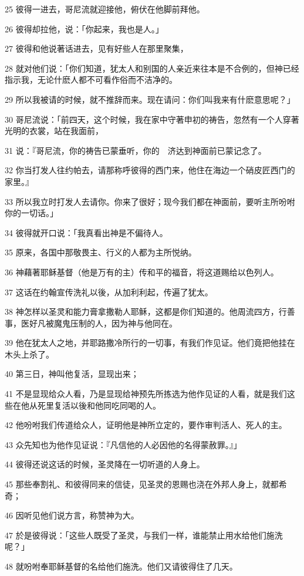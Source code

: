 \par 25 彼得一进去，哥尼流就迎接他，俯伏在他脚前拜他。
\par 26 彼得却拉他，说：「你起来，我也是人。」
\par 27 彼得和他说著话进去，见有好些人在那里聚集，
\par 28 就对他们说：「你们知道，犹太人和别国的人亲近来往本是不合例的，但神已经指示我，无论什麽人都不可看作俗而不洁净的。
\par 29 所以我被请的时候，就不推辞而来。现在请问：你们叫我来有什麽意思呢？」
\par 30 哥尼流说：「前四天，这个时候，我在家中守著申初的祷告，忽然有一个人穿著光明的衣裳，站在我面前，
\par 31 说：『哥尼流，你的祷告已蒙垂听，你的　济达到神面前已蒙记念了。
\par 32 你当打发人往约帕去，请那称呼彼得的西门来，他住在海边一个硝皮匠西门的家里。』
\par 33 所以我立时打发人去请你。你来了很好；现今我们都在神面前，要听主所吩咐你的一切话。」
\par 34 彼得就开口说：「我真看出神是不偏待人。
\par 35 原来，各国中那敬畏主、行义的人都为主所悦纳。
\par 36 神藉著耶稣基督（他是万有的主）传和平的福音，将这道赐给以色列人。
\par 37 这话在约翰宣传洗礼以後，从加利利起，传遍了犹太。
\par 38 神怎样以圣灵和能力膏拿撒勒人耶稣，这都是你们知道的。他周流四方，行善事，医好凡被魔鬼压制的人，因为神与他同在。
\par 39 他在犹太人之地，并耶路撒冷所行的一切事，有我们作见证。他们竟把他挂在木头上杀了。
\par 40 第三日，神叫他复活，显现出来；
\par 41 不是显现给众人看，乃是显现给神预先所拣选为他作见证的人看，就是我们这些在他从死里复活以後和他同吃同喝的人。
\par 42 他吩咐我们传道给众人，证明他是神所立定的，要作审判活人、死人的主。
\par 43 众先知也为他作见证说：『凡信他的人必因他的名得蒙赦罪。』」
\par 44 彼得还说这话的时候，圣灵降在一切听道的人身上。
\par 45 那些奉割礼、和彼得同来的信徒，见圣灵的恩赐也浇在外邦人身上，就都希奇；
\par 46 因听见他们说方言，称赞神为大。
\par 47 於是彼得说：「这些人既受了圣灵，与我们一样，谁能禁止用水给他们施洗呢？」
\par 48 就吩咐奉耶稣基督的名给他们施洗。他们又请彼得住了几天。

